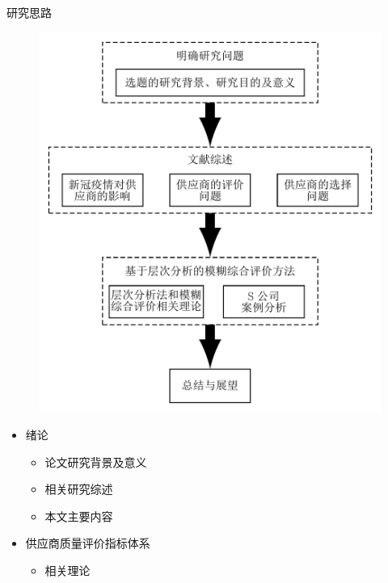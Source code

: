 \documentclass{beamer}
\begin{document}
\begin{frame}{研究思路}
	\begin{minipage}{0.2\linewidth}
	\vspace{-3mm}
\begin{figure}[h]
	\centering
	\includegraphics[height=0.95\textheight,trim=0 0 0 0,clip]{pic/研究思路.pdf}
\end{figure}
	\end{minipage}\hspace{4.3cm}
	\begin{minipage}{0.38\linewidth}
		\vspace{-3mm}
		\footnotesize{
		\begin{itemize}
			\item 绪论
				\begin{itemize}
				\scriptsize
				\item 论文研究背景及意义 
				\item 相关研究综述
				\item 本文主要内容
			\end{itemize}
			\item 供应商质量评价指标体系
				\begin{itemize}
				\scriptsize
				\item 相关理论

\end{itemize}
\end{itemize}}
\end{minipage}
\end{frame}
\end{document}
